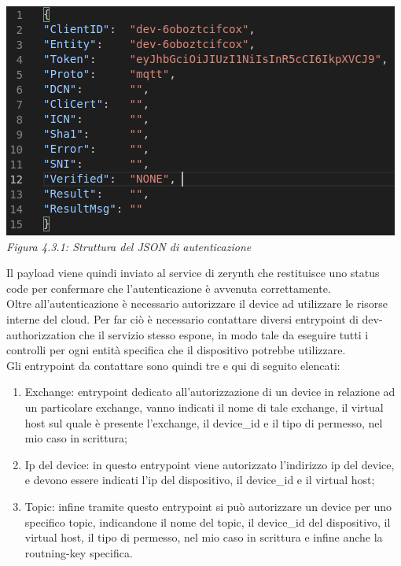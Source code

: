 \documentclass[a4paper,titlepage,12pt]{book}
\begin{document}
\begin{center}
\includegraphics[scale=0.6]{images/auth_json.png}\\ 
\textit{Figura 4.3.1: Struttura del JSON di autenticazione}
\end{center}

Il payload viene quindi inviato al service di zerynth che restituisce uno status code per confermare che l'autenticazione è avvenuta correttamente.\\
Oltre all'autenticazione è necessario autorizzare il device ad utilizzare le risorse interne del cloud. Per far ciò è necessario contattare diversi entrypoint di dev-authorizzation che il servizio stesso espone, in modo tale da eseguire tutti i controlli per ogni entità specifica che il dispositivo potrebbe utilizzare.
\\Gli entrypoint da contattare sono quindi tre e qui di seguito elencati:

\begin{enumerate}
\item Exchange: entrypoint dedicato all'autorizzazione di un device in relazione ad un particolare exchange, vanno indicati il nome di tale exchange, il virtual host sul quale è presente l'exchange, il device\_id e il tipo di permesso, nel mio caso in scrittura;

\item Ip del device: in questo entrypoint viene autorizzato l'indirizzo ip del device, e devono essere indicati l'ip del dispositivo, il device\_id e il virtual host;

\item Topic: infine tramite questo entrypoint si può autorizzare un device per uno specifico topic, indicandone il nome del topic, il device\_id del dispositivo, il virtual host, il tipo di permesso, nel mio caso in scrittura e infine anche la routning-key specifica.

\end{enumerate}
\end{document}
